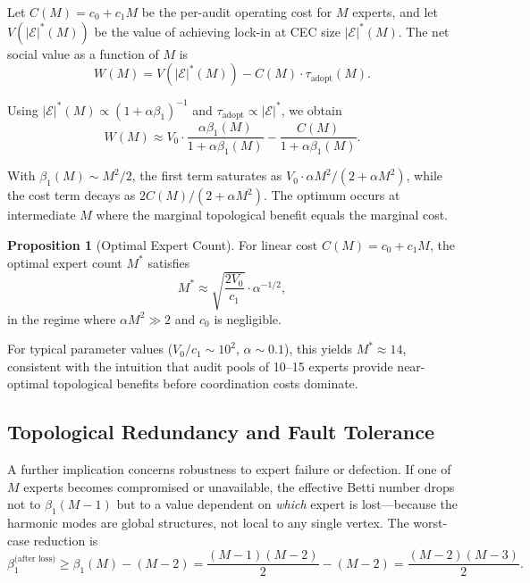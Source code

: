\documentclass[12pt,a4paper]{article}
\theoremstyle{definition}
\newtheorem{proposition}{Proposition}[section]
\theoremstyle{remark}
\theoremstyle{definition}
\newcommand{\CEC}{\mathcal{E}}
\newcommand{\CECstar}{|\CEC|^*}
\begin{document}
Let $C(M) = c_0 + c_1 M$ be the per-audit operating cost for $M$ experts, and let $V(\CECstar(M))$ be the value of achieving lock-in at CEC size $\CECstar(M)$. The net social value as a function of $M$ is
\begin{equation}
  W(M) = V(\CECstar(M)) - C(M) \cdot \tau_{\text{adopt}}(M).
\end{equation}

Using $\CECstar(M) \propto (1 + \alpha\beta_1)^{-1}$ and $\tau_{\text{adopt}} \propto \CECstar$, we obtain
\begin{equation}
  W(M) \approx V_0 \cdot \frac{\alpha\beta_1(M)}{1+\alpha\beta_1(M)} - \frac{C(M)}{1+\alpha\beta_1(M)}.
\end{equation}

With $\beta_1(M) \sim M^2/2$, the first term saturates as $V_0 \cdot \alpha M^2/(2 + \alpha M^2)$, while the cost term decays as $2C(M)/(2+\alpha M^2)$. The optimum occurs at intermediate $M$ where the marginal topological benefit equals the marginal cost.

\begin{proposition}[Optimal Expert Count]\label{prop:optimal_M}
  For linear cost $C(M) = c_0 + c_1 M$, the optimal expert count $M^*$ satisfies
  \begin{equation}
    M^* \approx \sqrt{\frac{2V_0}{c_1}} \cdot \alpha^{-1/2},
  \end{equation}
  in the regime where $\alpha M^2 \gg 2$ and $c_0$ is negligible.
\end{proposition}

For typical parameter values ($V_0/c_1 \sim 10^2$, $\alpha \sim 0.1$), this yields $M^* \approx 14$, consistent with the intuition that audit pools of 10--15 experts provide near-optimal topological benefits before coordination costs dominate.

\subsection{Topological Redundancy and Fault Tolerance}

A further implication concerns robustness to expert failure or defection. If one of $M$ experts becomes compromised or unavailable, the effective Betti number drops not to $\beta_1(M-1)$ but to a value dependent on \emph{which} expert is lost---because the harmonic modes are global structures, not local to any single vertex. The worst-case reduction is
\begin{equation}
  \beta_1^{\text{(after loss)}} \geq \beta_1(M) - (M-2) = \frac{(M-1)(M-2)}{2} - (M-2) = \frac{(M-2)(M-3)}{2}.
\end{equation}
\end{document}
